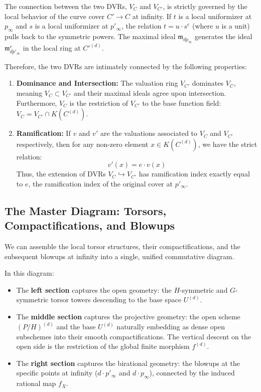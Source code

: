 The connection between the two DVRs, $V_C$ and $V_{C'}$, is strictly governed by the local behavior of the curve cover $C' \to C$ at infinity. If $t$ is a local uniformizer at $p_\infty$ and $s$ is a local uniformizer at $p'_\infty$, the relation $t = u \cdot s^e$ (where $u$ is a unit) pulls back to the symmetric powers. The maximal ideal $\mathfrak{m}_{d p_\infty}$ generates the ideal $\mathfrak{m}_{d p'_\infty}^e$ in the local ring at $C'^{(d)}$.

Therefore, the two DVRs are intimately connected by the following properties:
\begin{enumerate}
    \item \textbf{Dominance and Intersection:} The valuation ring $V_{C'}$ dominates $V_C$, meaning $V_C \subset V_{C'}$ and their maximal ideals agree upon intersection. Furthermore, $V_C$ is the restriction of $V_{C'}$ to the base function field: $V_C = V_{C'} \cap K(C^{(d)})$.
    \item \textbf{Ramification:} If $v$ and $v'$ are the valuations associated to $V_C$ and $V_{C'}$ respectively, then for any non-zero element $x \in K(C^{(d)})$, we have the strict relation:
    \[
    v'(x) = e \cdot v(x)
    \]
    Thus, the extension of DVRs $V_C \hookrightarrow V_{C'}$ has ramification index exactly equal to $e$, the ramification index of the original cover at $p'_\infty$.
\end{enumerate}

\subsection*{The Master Diagram: Torsors, Compactifications, and Blowups}

We can assemble the local torsor structures, their compactifications, and the subsequent blowups at infinity into a single, unified commutative diagram. 

In this diagram:
\begin{itemize}
    \item The \textbf{left section} captures the open geometry: the $H$-symmetric and $G$-symmetric torsor towers descending to the base space $U^{(d)}$.
    \item The \textbf{middle section} captures the projective geometry: the open scheme $(P/H)^{(d)}$ and the base $U^{(d)}$ naturally embedding as dense open subschemes into their smooth compactifications. The vertical descent on the open side is the restriction of the global finite morphism $f^{(d)}$.
    \item The \textbf{right section} captures the birational geometry: the blowups at the specific points at infinity ($d \cdot p'_\infty$ and $d \cdot p_\infty$), connected by the induced rational map $f_X$.
\end{itemize}

